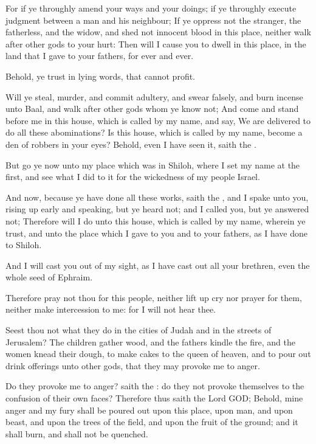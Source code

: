 \verse For if ye throughly amend your ways and your doings; if ye throughly execute judgment between a man and his neighbour; \verse If ye oppress not the stranger, the fatherless, and the widow, and shed not innocent blood in this place, neither walk after other gods to your hurt: \verse Then will I cause you to dwell in this place, in the land that I gave to your fathers, for ever and ever.

\verse Behold, ye trust in lying words, that cannot profit.

\verse Will ye steal, murder, and commit adultery, and swear falsely, and burn incense unto Baal, and walk after other gods whom ye know not; \verse And come and stand before me in this house, which is called by my name, and say, We are delivered to do all these abominations?  \verse Is this house, which is called by my name, become a den of robbers in your eyes? Behold, even I have seen it, saith the \LORD.

\verse But go ye now unto my place which was in Shiloh, where I set my name at the first, and see what I did to it for the wickedness of my people Israel.

\verse And now, because ye have done all these works, saith the \LORD, and I spake unto you, rising up early and speaking, but ye heard not; and I called you, but ye answered not; \verse Therefore will I do unto this house, which is called by my name, wherein ye trust, and unto the place which I gave to you and to your fathers, as I have done to Shiloh.

\verse And I will cast you out of my sight, as I have cast out all your brethren, even the whole seed of Ephraim.

\verse Therefore pray not thou for this people, neither lift up cry nor prayer for them, neither make intercession to me: for I will not hear thee.

\verse Seest thou not what they do in the cities of Judah and in the streets of Jerusalem?  \verse The children gather wood, and the fathers kindle the fire, and the women knead their dough, to make cakes to the queen of heaven, and to pour out drink offerings unto other gods, that they may provoke me to anger.

\verse Do they provoke me to anger? saith the \LORD: do they not provoke themselves to the confusion of their own faces?  \verse Therefore thus saith the Lord GOD; Behold, mine anger and my fury shall be poured out upon this place, upon man, and upon beast, and upon the trees of the field, and upon the fruit of the ground; and it shall burn, and shall not be quenched.


